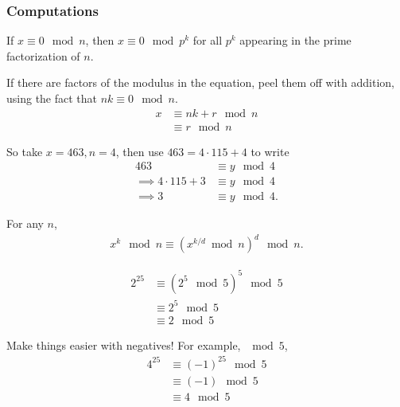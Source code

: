 \hypertarget{computations}{%
\subsubsection{Computations}\label{computations}}

\begin{proposition}[?]

If \(x\equiv 0 \mod n\), then \(x\equiv 0 \mod p^k\) for all \(p^k\)
appearing in the prime factorization of \(n\).

\end{proposition}

\begin{remark}

If there are factors of the modulus in the equation, peel them off with
addition, using the fact that \(nk \equiv 0 \mod n\).
\begin{align*}
x 
&\equiv nk + r \mod n  \\
&\equiv r \mod n
\end{align*}

So take \(x=463, n = 4\), then use \(463 = 4\cdot 115 + 4\) to write
\begin{align*}  
463 &\equiv y \mod 4 \\
\implies 4\cdot 115 + 3 &\equiv y \mod 4 \\
\implies  3&\equiv y\mod 4
.\end{align*}

\end{remark}

\begin{proposition}

For any \(n\),
\begin{align*}  
x^k \mod n \equiv (x^{k/d} \bmod n)^d \mod n
.\end{align*}

\end{proposition}

\begin{example}[?]

\begin{align*}
2^{25} 
&\equiv (2^5 \mod 5)^5 \mod 5 \\
&\equiv 2^5  \mod 5 \\
&\equiv 2 \mod 5 
\end{align*}

\end{example}

\begin{remark}

Make things easier with negatives! For example, \(\mod 5\),
\begin{align*}
4^{25} 
&\equiv (-1)^{25} \mod 5\\
&\equiv (-1) \mod 5\\
&\equiv 4 \mod 5
\end{align*}

\end{remark}

